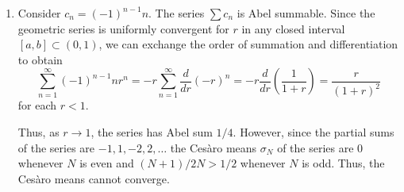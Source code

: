 \documentclass[12 pt, letterpaper]{hmcpset}
\begin{document}
\begin{solution}
\begin{enumerate}
			We will show
			\[
				\sum_{n = 1}^{\infty} c_{n} r^{n} = (1 - r)^{2} \sum_{n = 1}^{\infty} n \sigma_{n} r^{n}.
			\]
			Thus, as $r \to 1$, and $n \sigma_{n} (r^{n} - r^{n + 2}) \to 0$ for each $n$, we have
			\[
				\sum_{n = 1}^{\infty} c_{n} r^{n} \to 0.
			\]

			We can show the desired identity by rearranging partial sums to be telescoping ---
			\begin{align*}
				(1 - r)^{2} \sum_{n = 1}^{N} n \sigma_{n} r^{n} & = (1 - r)^{2}	\sum_{n = 1}^{N} n \sigma_{n} r^{n} \\
										& = \sum_{n = 1}^{N} n \sigma_{n} r^{n + 2} + n \sigma_{n} r^{n} - 2 n \sigma_{n} r^{n + 1} \\
										& = N \sigma_{N} (r^{N + 2} - r^{N + 1} + r^{N} - r^{N + 1}) + (N - 1) \sigma_{N - 1} (r^{N + 1} - r^{N} + r^{N - 1} - r^{N}) \\
										& + \dots + 2 \sigma_{2} (r^{4} - r^{3} + r^{2} - r^{3}) + \sigma_{1}(r^{3} - r^{2} + r - r^{2}) \\
										& = N \sigma_{N} (r^{N + 2} - r^{N + 1}) + (N \sigma_{N} -(N - 1) \sigma_{N - 1})(r^{N} - r^{N + 1}) \\
										& + \dots + (2 \sigma_{2} - \sigma_{1}) (r^{2} - r^{3}) + \sigma_{1} (r - r^{2}) \\
										& = N \sigma_{N} (r^{N + 2} - r^{N + 1}) + \sum_{n = 1}^{N} s_{n} (r^{n} - r^{n + 1}) \\
										& = N \sigma_{N} (r^{N + 2} - r^{N + 1}) + (1 - r) \sum_{n = 1}^{N} s_{n} r^{n}.
			\end{align*}

			Taking limits as $N \to \infty$ we get $(1 - r) \sum_{n = 1}^{N} s_{n} r^{n} = \sum c_{n} r^{n}$ by the previous part. Thus,
			\[
				(1 - r)^{2} \sum_{n = 1}^{\infty} n \sigma_{n} r^{n} = N \sigma_{N} (r^{N + 2} - r^{N + 1}) + \sum_{n = 1}^{\infty} c_{n} r^{n}.
			\]

			Further, as $r \to 1$ we have $N \sigma_{N} (r^{N + 2} - r^{N + 1}) \to 0$ and $(1 - r)^{2} \sum_{n = 1}^{N} n \sigma_{n} r^{n} \to 0$. Thus,
			\[
				(1 - r)^{2} \sum_{n = 1}^{\infty} n \sigma_{n} r^{n} = \sum_{n = 1}^{\infty} c_{n} r^{n}.
			\]

		\item Consider $c_{n} = (-1)^{n - 1} n$. The series $\sum c_{n}$ is Abel summable. Since the geometric series is uniformly convergent for $r$ in any closed interval $[a, b] \subset (0, 1)$, we can exchange the order of summation and differentiation to obtain
			\[
				\sum_{n = 1}^{\infty} (-1)^{n - 1} n r^{n}  = -r \sum_{n = 1}^{\infty} \frac{d }{d r} (-r)^{n} = -r \frac{d}{dr} \left ( \frac{1}{1 + r} \right ) = \frac{r}{(1 + r)^{2}}
			\]
			for each $r < 1$.

			Thus, as $r \to 1$, the series has Abel sum $1 / 4$. However, since the partial sums of the series are $-1, 1, -2, 2, \dots$ the Ces\`aro means $\sigma_{N}$ of the series are $0$ whenever $N$ is even and $(N + 1) / 2N > 1 / 2$ whenever $N$ is odd. Thus, the Ces\`aro means cannot converge.
	\end{enumerate}
\end{solution}
\end{document}
